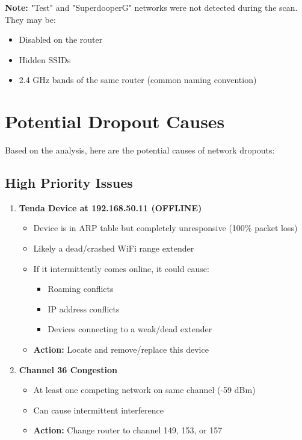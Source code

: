 \documentclass[11pt,letterpaper]{article}
\begin{document}
\textbf{Note:} "Test" and "SuperdooperG" networks were not detected during the scan. They may be:
\begin{itemize}
    \item Disabled on the router
    \item Hidden SSIDs
    \item 2.4 GHz bands of the same router (common naming convention)
\end{itemize}

\section{Potential Dropout Causes}

Based on the analysis, here are the potential causes of network dropouts:

\subsection{High Priority Issues}

\begin{enumerate}
    \item \textcolor{warningcolor}{\textbf{Tenda Device at 192.168.50.11 (OFFLINE)}}
    \begin{itemize}
        \item Device is in ARP table but completely unresponsive (100\% packet loss)
        \item Likely a dead/crashed WiFi range extender
        \item If it intermittently comes online, it could cause:
        \begin{itemize}
            \item Roaming conflicts
            \item IP address conflicts
            \item Devices connecting to a weak/dead extender
        \end{itemize}
        \item \textbf{Action:} Locate and remove/replace this device
    \end{itemize}

    \item \textcolor{warningcolor}{\textbf{Channel 36 Congestion}}
    \begin{itemize}
        \item At least one competing network on same channel (-59 dBm)
        \item Can cause intermittent interference
        \item \textbf{Action:} Change router to channel 149, 153, or 157
    \end{itemize}
\end{enumerate}
\end{document}
